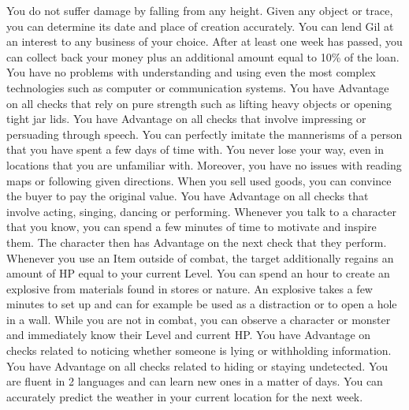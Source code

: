 {
	You do not suffer damage by falling from any height.
}
\vfill
{} 
{
	Given any object or trace, you can determine its date and place of creation accurately.
}
\vfill
{}
{
	You can lend Gil at an interest to any business of your choice.
	After at least one week has passed, you can collect back your money plus an additional amount equal to 10\% of the loan.
}
\vfill
{}
{
	You have no problems with understanding and using even the most complex technologies such as computer or communication systems.
}
\vfill
{}
{
	You have Advantage on all checks that rely on pure strength such as lifting heavy objects or opening tight jar lids.
}
\vfill
{}
{
	You have Advantage on all checks that involve impressing or persuading through speech. 
}
\vfill
{}
{
	You can perfectly imitate the mannerisms of a person that you have spent a few days of time with.
}
\vfill
{}
{
	You never lose your way, even in locations that you are unfamiliar with.
	Moreover, you have no issues with reading maps or following given directions. 
}
\vfill
{}
{
	When you sell used goods, you can convince the buyer to pay the original value.
}
\vfill
{}
{
	You have Advantage on all checks that involve acting, singing, dancing or performing.
}
\vfill
{}
{
	Whenever you talk to a character that you know, you can spend a few minutes of time to motivate and inspire them.
	The character then has Advantage on the next check that they perform.
}
\vfill
{}
{
	Whenever you use an Item outside of combat, the target additionally regains an amount of HP equal to your current Level. 
}
\vfill
{} {
	You can spend an hour to create an explosive from materials found in stores or nature.
	An explosive takes a few minutes to set up and can for example be used as a distraction or to open a hole in a wall.
}
\vfill
{}
{
	While you are not in combat, you can observe a character or monster and immediately know their Level and current HP.
}
\vfill
{}
{
	You have Advantage on checks related to noticing whether someone is lying or withholding information.
}
%
\newpage
%
{
	You have Advantage on all checks related to hiding or staying undetected.
}
\vfill
{}
{
	You are fluent in 2 languages and can learn new ones in a matter of days.
}
\vfill
{}
{
	You can accurately predict the weather in your current location for the next week.
}
